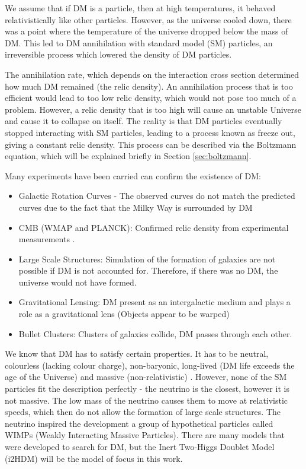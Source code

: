 \documentclass[12pt]{article}
\begin{document}
We assume that if DM is a particle, then at high temperatures, it behaved relativistically like other particles. However, as the universe cooled down, there was a point where the temperature of the universe dropped below the mass of DM. This led to DM annihilation with standard model (SM) particles, an irreversible process which lowered the density of DM particles. 

The annihilation rate, which depends on the interaction cross section determined how much DM remained (the relic density). An annihilation process that is too efficient would lead to too low relic density, which would not pose too much of a problem. However, a relic density that is too high will cause an unstable Universe and cause it to collapse on itself. The reality is that DM particles eventually stopped interacting with SM particles, leading to a process known as freeze out, giving a constant relic density. This process can be described via the Boltzmann equation, which will be explained briefly in Section \ref{sec:boltzmann}.

Many experiments have been carried can confirm the existence of DM:
\begin{itemize}
    \item Galactic Rotation Curves - The observed curves do not match the predicted curves due to the fact that the Milky Way is surrounded by DM
    \item CMB (WMAP and PLANCK): Confirmed relic density from experimental measurements \cite{Planck:2018vyg}.
    \item Large Scale Structures: Simulation of the formation of galaxies are not possible if DM is not accounted for. Therefore, if there was no DM, the universe would not have formed.
    \item Gravitational Lensing: DM present as an intergalactic medium and plays a role as a gravitational lens (Objects appear to be warped)
    \item Bullet Clusters: Clusters of galaxies collide, DM passes through each other.
\end{itemize}

We know that DM has to satisfy certain properties. It has to be neutral, colourless (lacking colour charge), non-baryonic, long-lived (DM life exceeds the age of the Universe) and massive (non-relativistic) \cite{ZACEK_2007, DeLuca2018, gondolo2004introductionnonbaryonicdarkmatter}. However, none of the SM particles fit the description perfectly - the neutrino is the closest, however it is not massive. The low mass of the neutrino causes them to move at relativistic speeds, which then do not allow the formation of large scale structures. The neutrino inspired the development a group of hypothetical particles called WIMPs (Weakly Interacting Massive Particles). There are many models that were developed to search for DM, but the Inert Two-Higgs Doublet Model (i2HDM) will be the model of focus in this work. 
\end{document}
